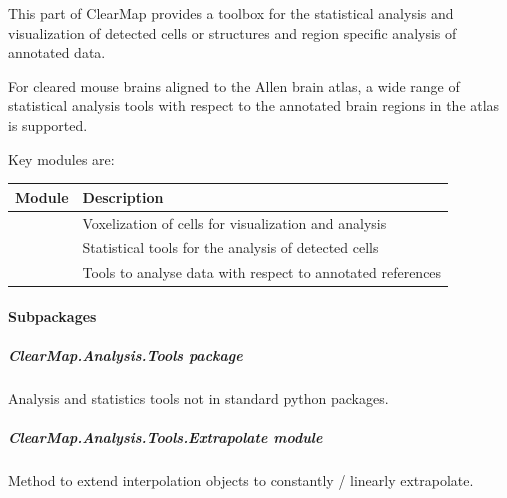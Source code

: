 \documentclass[letterpaper,10pt,english]{sphinxmanual}
\begin{document}
This part of ClearMap provides a toolbox for the statistical analysis and
visualization of detected cells or structures and region specific analysis
of annotated data.

For cleared mouse brains aligned to the Allen brain atlas, a wide range of
statistical analysis tools with respect to the annotated brain regions in
the atlas is supported.

Key modules are:

\begin{tabulary}{\linewidth}{|L|L|}
\hline
\textsf{\relax 
Module
} & \textsf{\relax 
Description
}\\
\hline
{\hyperref[api/ClearMap.Analysis:module-ClearMap.Analysis.Voxelization]{\emph{}}}
 & 
Voxelization of cells for visualization and analysis
\\
\hline
{\hyperref[api/ClearMap.Analysis:module-ClearMap.Analysis.Statistics]{\emph{}}}
 & 
Statistical tools for the analysis of detected cells
\\
\hline
{\hyperref[api/ClearMap.Analysis:module-ClearMap.Analysis.Label]{\emph{}}}
 & 
Tools to analyse data with respect to annotated references
\\
\hline\end{tabulary}



\paragraph{Subpackages}
\label{api/ClearMap.Analysis:subpackages}

\subparagraph{ClearMap.Analysis.Tools package}
\label{api/ClearMap.Analysis.Tools:clearmap-analysis-tools-package}\label{api/ClearMap.Analysis.Tools:module-ClearMap.Analysis.Tools}\label{api/ClearMap.Analysis.Tools::doc}
Analysis and statistics tools not in standard python packages.


\subparagraph{ClearMap.Analysis.Tools.Extrapolate module}
\label{api/ClearMap.Analysis.Tools:clearmap-analysis-tools-extrapolate-module}\label{api/ClearMap.Analysis.Tools:module-ClearMap.Analysis.Tools.Extrapolate}
Method to extend interpolation objects to constantly / linearly extrapolate.
\end{document}
